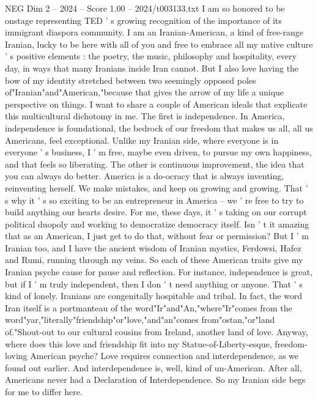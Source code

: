 \begin{textsample}{NEG Dim 2 – 2024 – Score 1.00 – 2024/t003133.txt}  \label{ex:f2_neg_064}
I am so honored to be onstage representing TED ' s growing recognition of the importance of its immigrant diaspora community.
I am an Iranian-American, a kind of free-range Iranian, lucky to be here with all of you and free to embrace all my native culture ' s positive elements : the poetry, the music, philosophy and hospitality, every day, in ways that many Iranians inside Iran cannot.
But I also love having the bow of my identity stretched between two seemingly opposed poles of"Iranian"and"American,"because that gives the arrow of my life a unique perspective on things.
I want to share a couple of American ideals that explicate this multicultural dichotomy in me.
The first is independence.
In America, independence is foundational, the bedrock of our freedom that makes us all, all us Americans, feel exceptional.
Unlike my Iranian side, where everyone is in everyone ' s business, I ' m free, maybe even driven, to pursue my own happiness, and that feels so liberating.
The other is continuous improvement, the idea that you can always do better.
America is a do-ocracy that is always inventing, reinventing herself.
We make mistakes, and keep on growing and growing.
That ' s why it ' s so exciting to be an entrepreneur in America -- we ' re free to try to build anything our hearts desire.
For me, these days, it ' s taking on our corrupt political duopoly and working to democratize democracy itself.
Isn ' t it amazing that as an American, I just get to do that, without fear or permission?
But I ' m Iranian too, and I have the ancient wisdom of Iranian mystics, Ferdowsi, Hafez and Rumi, running through my veins.
So each of these American traits give my Iranian psyche cause for pause and reflection.
For instance, independence is great, but if I ' m truly independent, then I don ' t need anything or anyone.
That ' s kind of lonely.
Iranians are congenitally hospitable and tribal.
In fact, the word Iran itself is a portmanteau of the word"Ir"and"An,"where"Ir"comes from the word"yar,"literally"friendship"or"love,"and"an"comes from"ostan,"or"land of."Shout-out to our cultural cousins from Ireland, another land of love.
Anyway, where does this love and friendship fit into my Statue-of-Liberty-esque, freedom-loving American psyche?
Love requires connection and interdependence, as we found out earlier.
And interdependence is, well, kind of un-American.
After all, Americans never had a Declaration of Interdependence.
So my Iranian side begs for me to differ here.

\end{textsample}

